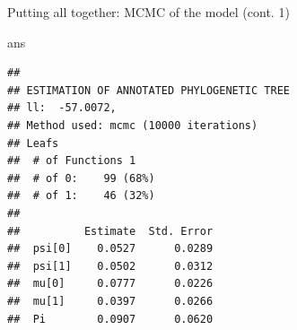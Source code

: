 \documentclass[9pt,ignorenonframetext,]{beamer}
\newenvironment{Shaded}{\begin{snugshade}}{\end{snugshade}}
\newcommand{\NormalTok}[1]{\textcolor[rgb]{0.80,0.80,0.80}{#1}}
\begin{document}
\begin{frame}[fragile,t]{Putting all together: MCMC of the model (cont.
1)}

\footnotesize

\begin{Shaded}
\begin{Highlighting}[]
\NormalTok{ans}
\end{Highlighting}
\end{Shaded}

\begin{verbatim}
## 
## ESTIMATION OF ANNOTATED PHYLOGENETIC TREE
## ll:  -57.0072,
## Method used: mcmc (10000 iterations)
## Leafs
##  # of Functions 1
##  # of 0:    99 (68%)
##  # of 1:    46 (32%)
## 
##          Estimate  Std. Error
##  psi[0]    0.0527      0.0289
##  psi[1]    0.0502      0.0312
##  mu[0]     0.0777      0.0226
##  mu[1]     0.0397      0.0266
##  Pi        0.0907      0.0620
\end{verbatim}

\normalsize

\end{frame}
\end{document}
